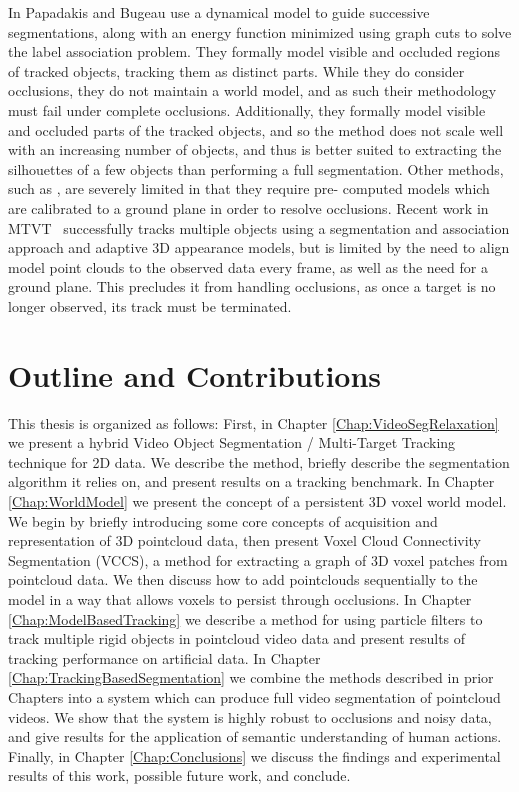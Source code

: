 In \cite{TrackingOcclusionsGraphCuts} Papadakis and Bugeau use a dynamical model to guide successive segmentations, along with an energy function minimized using graph cuts to solve the label association problem. They formally model visible and occluded regions of tracked objects, tracking them as distinct parts. While they do consider occlusions, they do not maintain a world model, and as such their methodology must fail under complete occlusions.  Additionally, they formally model visible and occluded parts of the tracked objects, and so the method does not scale well with an increasing number of objects, and thus is better suited to extracting the silhouettes of a few objects than performing a full segmentation. Other methods, such as \cite{LayeredGraphicalModels}, are severely limited in that they require pre-
computed models which are calibrated to a ground plane in order to resolve occlusions. Recent work in MTVT~\cite{MultiObjectTracking} successfully tracks multiple objects using a segmentation and association approach and adaptive 3D appearance models, but is limited by the need to align model point clouds to the observed data every frame, as well as the need for a ground plane. This precludes it from handling occlusions, as once a target is no longer observed, its track must be terminated.

\section{Outline and Contributions}

This thesis is organized as follows: First, in Chapter \ref{Chap:VideoSegRelaxation} we present a hybrid Video Object Segmentation / Multi-Target Tracking technique for 2D data. We describe the method, briefly describe the segmentation algorithm it relies on, and present results on a tracking benchmark. In Chapter \ref{Chap:WorldModel} we present the concept of a persistent 3D voxel world model. We begin by briefly introducing some core concepts of acquisition and representation of 3D pointcloud data, then present Voxel Cloud Connectivity Segmentation (VCCS), a method for extracting a graph of 3D voxel patches from pointcloud data. We then discuss how to add pointclouds sequentially to the model in a way that allows voxels to persist through occlusions. In Chapter \ref{Chap:ModelBasedTracking} we describe a method for using particle filters to track multiple rigid objects in pointcloud video data and present results of tracking performance on artificial data. In Chapter \ref{Chap:TrackingBasedSegmentation} we combine the methods described in prior Chapters into a system which can produce full video segmentation of pointcloud videos. We show that the system is highly robust to occlusions and noisy data, and give results for the application of semantic understanding of human actions. Finally, in Chapter \ref{Chap:Conclusions} we discuss the findings and experimental results of this work, possible future work, and conclude.

